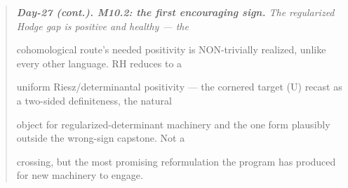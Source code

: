 \documentclass[10pt]{article}
\begin{document}
\begin{quote}\itshape
\textbf{Day-27 (cont.). M10.2: the first encouraging sign.} The regularized Hodge gap is positive and healthy --- the\par
cohomological route's needed positivity is NON-trivially realized, unlike every other language. RH reduces to a\par
uniform Riesz/determinantal positivity --- the cornered target (U) recast as a two-sided definiteness, the natural\par
object for regularized-determinant machinery and the one form plausibly outside the wrong-sign capstone. Not a\par
crossing, but the most promising reformulation the program has produced for new machinery to engage.\par
\end{quote}
\end{document}
